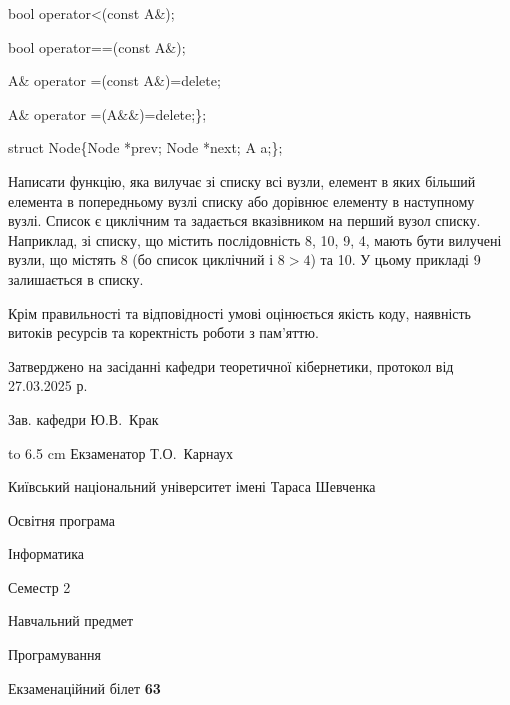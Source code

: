 \documentclass[12pt, ukrainian]{article}
\begin{document}
{\quad  bool operator<(const A\&); 

\quad  bool operator==(const A\&); 

\quad A\& operator =(const A\&)=delete; 

\quad  A\& operator =(A\&\&)=delete;\};

struct Node\{Node *prev; Node *next; A a;\};

Написати функцію, яка вилучає зі списку всі вузли, елемент в яких більший елемента в попередньому вузлі списку або дорівнює елементу в наступному вузлі. Список є циклічним та задається вказівником на перший вузол списку. Наприклад, зі списку, що містить послідовність 8, 10, 9, 4, мають бути вилучені вузли, що містять 8 (бо список циклічний і $8>4$) та 10. У цьому прикладі 9 залишається в списку.

Крім правильності та відповідності умові оцінюється якість коду, наявність витоків ресурсів та коректність роботи з пам'яттю. 

}
{\smallskip\smallskip \begin {scriptsize} Затверджено на засіданні кафедри теоретичної кібернетики, протокол   від   27.03.2025 р.\par\smallskip\smallskip\smallskip\smallskip
{\parbox {6.5 cm} {Зав. кафедри \dotfill Ю.В.~Крак}}\hspace {0.7cm} {\hbox to 6.5 cm { Екзаменатор \dotfill Т.О.~Карнаух}} \end{scriptsize}}
\newpage
{{\begin {scriptsize}\par
{ \center  Київський національний університет імені Тараса Шевченка \par}
{\parbox {5 cm}{Освітня програма \hfill}{\parbox {7 cm}{Інформатика\hfill}}\parbox {6 cm}{\hfill Семестр 2}}\par
{\parbox {5 cm} {Навчальний предмет \hfill}\parbox {7 cm}{Програмування \hfill}\parbox {6cm}{\hfill}\par}\vspace{-15pt} \end{scriptsize}}{\center Екзаменаційний білет \No \textbf { 63 }\par}}
\end{document}
